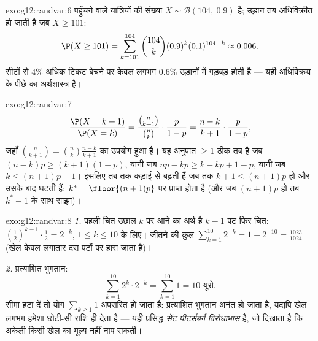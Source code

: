\begin{solution}{exo:g12:randvar:6}
पहुँचने वाले यात्रियों की संख्या $X \sim \mathcal B(104,\ 0.9)$ है; उड़ान तब अधिविक्रीत हो जाती है जब
$X \geq 101$:
\[
\P(X \geq 101) = \sum_{k=101}^{104}\binom{104}{k}(0.9)^k(0.1)^{104-k}
\approx 0.006 .
\]
सीटों से $4\%$ अधिक टिकट बेचने पर केवल लगभग $0.6\%$ उड़ानों में गड़बड़ होती है ---
यही अधिविक्रय के पीछे का अर्थशास्त्र है।
\end{solution}

\begin{solution}{exo:g12:randvar:7}
\[
\frac{\P(X = k+1)}{\P(X = k)}
= \frac{\binom{n}{k+1}}{\binom nk}\cdot\frac{p}{1-p}
= \frac{n - k}{k + 1}\cdot\frac{p}{1-p},
\]
जहाँ $\binom{n}{k+1} = \binom nk \frac{n-k}{k+1}$ का उपयोग हुआ है। यह अनुपात $\geq 1$ ठीक तब है जब $(n-k)p \geq (k+1)(1-p)$, यानी जब $np - k p \geq k - kp + 1 - p$,
यानी जब $k \leq (n+1)p - 1$। इसलिए  तब तक कड़ाई से बढ़ती हैं जब तक $k + 1 \leq (n+1)p$ हो और उसके
बाद घटती हैं:  $k^* = \floor{(n+1)p}$ पर प्राप्त होता है (और जब $(n+1)p$  हो तब $k^* - 1$
के साथ साझा)।
\end{solution}

\begin{solution}{exo:g12:randvar:8}
\emph{1.} पहली चित उछाल $k$ पर आने का अर्थ है $k-1$ पट फिर चित: 
$\left(\frac12\right)^{k-1}\cdot\frac12 = 2^{-k}$, $1 \leq k \leq 10$ के लिए। जीतने की कुल  $\sum_{k=1}^{10} 2^{-k} = 1 - 2^{-10} = \frac{1023}{1024}$ (खेल केवल लगातार दस पटों पर
हारा जाता है)।

\emph{2.} प्रत्याशित भुगतान:
\[
\sum_{k=1}^{10} 2^k \cdot 2^{-k} = \sum_{k=1}^{10} 1 = 10 \text{ यूरो}.
\]
सीमा हटा दें तो योग $\sum_{k\geq1} 1$ अपसरित हो जाता है: प्रत्याशित भुगतान अनंत हो जाता है,
यद्यपि खेल लगभग हमेशा छोटी-सी राशि ही देता है --- यही प्रसिद्ध \emph{सेंट
पीटर्सबर्ग विरोधाभास} है, जो दिखाता है कि अकेली  किसी खेल का मूल्य
नहीं नाप सकती।
\end{solution}

